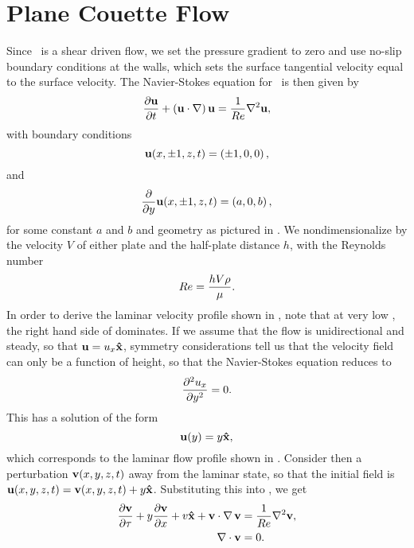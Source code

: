 \section{Plane Couette Flow}
Since \pCf\ is a shear driven flow, we set the pressure gradient to zero and use no-slip boundary conditions at the walls, which sets the surface tangential velocity equal to the surface velocity. The Navier-Stokes equation for \pCf\ is then given by 
\begin{equation}\label{eq:NSPCF}
\pder{1}{\Vector{u}}{t} + \paren{\Vector{u}\cdot\nabla}\Vector{u} = \frac{1}{\ReN}\nabla^2\Vector{u},
\end{equation}
with boundary conditions 
\begin{equation}\label{eq:PCBC}
\mathbf{u}(x,\pm1,z,t) = \left ( \pm1,0,0 \right ),
\end{equation}
and
\begin{equation}\label{eq:NPBC}
\pder{1}{}{y}\Vector{u}(x,\pm1,z,t) = \paren{a,0,b},
\end{equation}
for some constant $a$ and $b$ and geometry as pictured in . We nondimensionalize by the velocity $V$ of either plate and the half-plate distance $h$, with the Reynolds number
\begin{equation}
Re = \dfrac{hV\rho}{\mu}.
\end{equation} In order to derive the laminar velocity profile shown in , note that at very low \ReN, the right hand side of  dominates. If we assume that the flow is unidirectional and steady, so that $\mathbf{u} = u_x \mathbf{\hat{x}}$, symmetry considerations tell us that the velocity field can only be a function of height, so that the Navier-Stokes equation reduces to 
\begin{equation}
\pder{2}{u_x}{y} = 0.
\end{equation}
This has a solution of the form
\begin{equation}
\mathbf{u}(y) = y\mathbf{\hat{x}},
\end{equation}
which corresponds to the laminar flow profile shown in . Consider then a perturbation $\mathbf{v}(x,y,z,t)$ away from the laminar state, so that the initial field is $\mathbf{u}(x,y,z,t) = \mathbf{v} (x,y,z,t)+ y\mathbf{\hat{x}}$. Substituting this into , we get 
\begin{align}
\pder{1}{\Vector{v}}{\tau} + y\pder{1}{\Vector{v}}{x} + v\Vector{\hat{x}} + \Vector{v}\cdot\Grad{\Vector{v}} &= \frac{1}{\ReN} \nabla^2\Vector{v},\label{eq:PertND}\\
\Div{\Vector{v}} &= 0.
\end{align}
